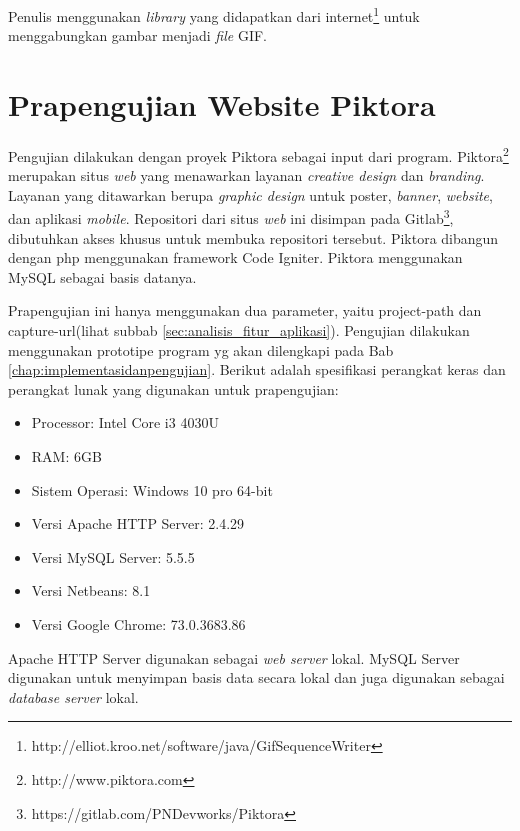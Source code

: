Penulis menggunakan \textit{library} yang didapatkan dari internet\footnote{http://elliot.kroo.net/software/java/GifSequenceWriter} untuk menggabungkan gambar menjadi \textit{file} GIF.


\section{Prapengujian Website Piktora}
\label{sec:prapengujian}
Pengujian dilakukan dengan proyek Piktora sebagai input dari program. Piktora\footnote{http://www.piktora.com} merupakan situs \textit{web} yang menawarkan layanan  \textit{creative design} dan \textit{branding}. Layanan yang ditawarkan berupa \textit{graphic design} untuk poster, \textit{banner}, \textit{website}, dan aplikasi \textit{mobile}. Repositori dari situs \textit{web} ini disimpan pada Gitlab\footnote{https://gitlab.com/PNDevworks/Piktora}, dibutuhkan akses khusus untuk membuka repositori tersebut. Piktora dibangun dengan php  menggunakan framework Code Igniter. Piktora menggunakan MySQL sebagai basis datanya. 

Prapengujian ini hanya menggunakan dua parameter, yaitu project-path dan capture-url(lihat subbab \ref{sec:analisis_fitur_aplikasi}). Pengujian dilakukan menggunakan prototipe program yg akan dilengkapi pada Bab \ref{chap:implementasidanpengujian}. Berikut adalah spesifikasi perangkat keras dan perangkat lunak yang digunakan untuk prapengujian:
\begin{itemize}
\item Processor: Intel Core i3 4030U
\item RAM: 6GB
\item Sistem Operasi: Windows 10 pro 64-bit
\item Versi Apache HTTP Server: 2.4.29
\item Versi MySQL Server: 5.5.5
\item Versi Netbeans: 8.1
\item Versi Google Chrome: 73.0.3683.86
\end{itemize}
Apache HTTP Server digunakan sebagai \textit{web server} lokal. MySQL Server digunakan untuk menyimpan basis data secara lokal dan juga digunakan sebagai \textit{database server} lokal. 


